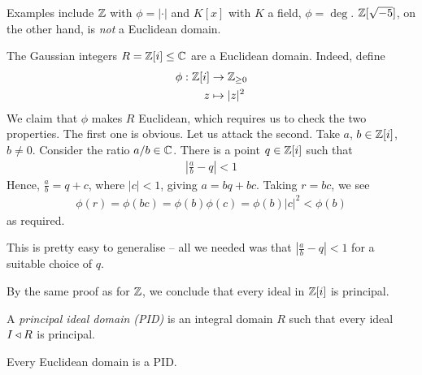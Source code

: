 \documentclass{../template/note}
\begin{document}
    \begin{example*}
        Examples include $\mathbb Z$ with $\phi = |\cdot|$ and $K[x]$ with $K$ a field, $\phi = \deg$. $\mathbb Z[\sqrt{-5}]$, on the other hand, is \emph{not} a Euclidean domain.
    \end{example*}
    
    \begin{example*}
        The Gaussian integers $R = \mathbb Z[i] \leq \mathbb C$ are a Euclidean domain. Indeed, define
        \begin{align*}
            \phi: \mathbb Z[i] &\to \mathbb Z_{\geq 0} \\
            z &\mapsto |z|^2
        \end{align*}
        We claim that $\phi$ makes $R$ Euclidean, which requires us to check the two properties. The first one is obvious. Let us attack the second. Take $a$, $b \in \mathbb Z[i]$, $b \neq 0$. Consider the ratio $a/b \in \mathbb C$. There is a point $q \in \mathbb Z[i]$ such that
        \begin{align*}
            \left|\frac a b - q\right| < 1
        \end{align*}
        Hence, $\frac a b = q + c$, where $|c| < 1$, giving $a = bq + bc$. Taking $r=bc$, we see
        \begin{align*}
            \phi(r) = \phi(bc) = \phi(b)\phi(c) = \phi(b)|c|^2 < \phi(b)
        \end{align*}
        as required.
    \end{example*}
    
    \begin{remark*}
        This is pretty easy to generalise -- all we needed was that $\left|\frac a b - q\right| < 1$ for a suitable choice of $q$.
    \end{remark*}

    \begin{remark*}
        By the same proof as for $\mathbb Z$, we conclude that every ideal in $\mathbb Z[i]$ is principal.
    \end{remark*}
    
    \begin{definition}
        A \emph{principal ideal domain (PID)} is an integral domain $R$ such that every ideal $I \triangleleft R$ is principal.
    \end{definition}
    
    \begin{proposition}
        Every Euclidean domain is a PID.
    \end{proposition}
    
\end{document}
